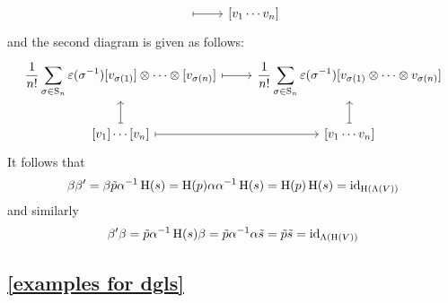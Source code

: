 \begin{enumerate}
\[\begin{tikzcd}
        \arrow[mapsto]{r}
        &
        {[v_1 \dotsm v_n]}
      \end{tikzcd}
    \]
    and the second diagram is given as follows:
    \[
      \begin{tikzcd}
        \displaystyle
        \frac{1}{n!} \sum_{\sigma \in \symm_n} \varepsilon(\sigma^{-1})
        {[v_{\sigma(1)}]} \tensor \dotsb \tensor {[v_{\sigma(n)}]}
        \arrow[mapsto]{r}
        &
        \displaystyle
        \frac{1}{n!} \sum_{\sigma \in \symm_n} \varepsilon(\sigma^{-1})
        {[v_{\sigma(1)} \tensor \dotsb \tensor v_{\sigma(n)}]}
        \\
        {[v_1]} \dotsm {[v_n]}
        \arrow[mapsto]{u}
        \arrow[mapsto]{r}
        &
        {[v_1 \dotsm v_n]}
        \arrow[mapsto]{u}
      \end{tikzcd}
    \]
    It follows that
    \[
      \beta \beta'
      =
      \beta \tilde{p} \alpha^{-1} \operatorname{H}(s)
      =
      \operatorname{H}(p) \alpha \alpha^{-1} \operatorname{H}(s)
      =
      \operatorname{H}(p) \operatorname{H}(s)
      =
      \operatorname{id}_{\operatorname{H}(\operatorname{\Lambda}(V))}
    \]
    and similarly
    \[
      \beta' \beta
      =
      \tilde{p} \alpha^{-1} \operatorname{H}(s) \beta
      =
      \tilde{p} \alpha^{-1} \alpha \tilde{s}
      =
      \tilde{p} \tilde{s}
      =
      \operatorname{id}_{\operatorname{\Lambda}(\operatorname{H}(V))}
    \]
\end{enumerate}





\subsection{\cref{examples for dgls}}
\label{examples for dgls proof}

